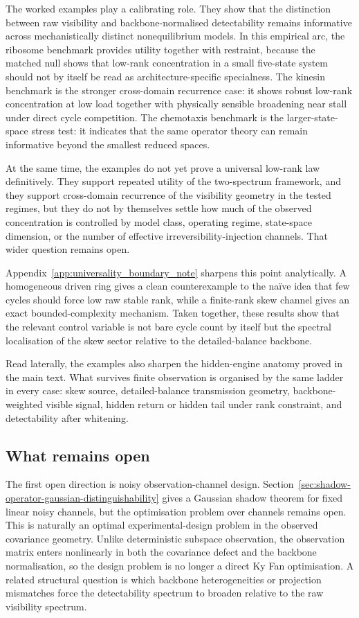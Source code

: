 \documentclass[11pt,a4paper]{article}
\numberwithin{equation}{section}
\theoremstyle{thmcompact}
\theoremstyle{remark}
\begin{document}
The worked examples play a calibrating role. They show that the distinction between raw visibility and backbone-normalised detectability remains informative across mechanistically distinct nonequilibrium models. In this empirical arc, the ribosome benchmark provides utility together with restraint, because the matched null shows that low-rank concentration in a small five-state system should not by itself be read as architecture-specific specialness. The kinesin benchmark is the stronger cross-domain recurrence case: it shows robust low-rank concentration at low load together with physically sensible broadening near stall under direct cycle competition. The chemotaxis benchmark is the larger-state-space stress test: it indicates that the same operator theory can remain informative beyond the smallest reduced spaces.

At the same time, the examples do not yet prove a universal low-rank law definitively. They support repeated utility of the two-spectrum framework, and they support cross-domain recurrence of the visibility geometry in the tested regimes, but they do not by themselves settle how much of the observed concentration is controlled by model class, operating regime, state-space dimension, or the number of effective irreversibility-injection channels. That wider question remains open.

Appendix~\ref{app:universality_boundary_note} sharpens this point analytically. A homogeneous driven ring gives a clean counterexample to the naïve idea that few cycles should force low raw stable rank, while a finite-rank skew channel gives an exact bounded-complexity mechanism. Taken together, these results show that the relevant control variable is not bare cycle count by itself but the spectral localisation of the skew sector relative to the detailed-balance backbone.

Read laterally, the examples also sharpen the hidden-engine anatomy proved in the main text. What survives finite observation is organised by the same ladder in every case: skew source, detailed-balance transmission geometry, backbone-weighted visible signal, hidden return or hidden tail under rank constraint, and detectability after whitening.

\subsection{What remains open}

The first open direction is noisy observation-channel design. Section~\ref{sec:shadow-operator-gaussian-distinguishability} gives a Gaussian shadow theorem for fixed linear noisy channels, but the optimisation problem over channels remains open. This is naturally an optimal experimental-design problem in the observed covariance geometry. Unlike deterministic subspace observation, the observation matrix enters nonlinearly in both the covariance defect and the backbone normalisation, so the design problem is no longer a direct Ky Fan optimisation. A related structural question is which backbone heterogeneities or projection mismatches force the detectability spectrum to broaden relative to the raw visibility spectrum.
\end{document}
